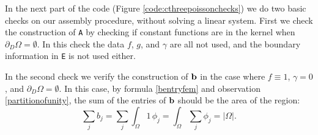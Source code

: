 In the next part of the code (Figure \ref{code:cthreepoissonchecks}) we do two basic checks on our assembly procedure, without solving a linear system.  First we check the construction of \texttt{A} by checking if constant functions are in the kernel when $\partial_D\Omega=\emptyset$.  In this check the data $f$, $g$, and $\gamma$ are all not used, and the boundary information in \texttt{E} is not used either.


In the second check we verify the construction of $\mathbf{b}$ in the case where $f\equiv 1$, $\gamma=0$, and $\partial_D\Omega=\emptyset$.  In this case, by formula \eqref{bentryfem} and observation \eqref{partitionofunity}, the sum of the entries of $\mathbf{b}$ should be the area of the region:
   $$\sum_j b_j = \sum_j \int_\Omega 1\, \phi_j = \int_\Omega \sum_j \phi_j = |\Omega|.$$






